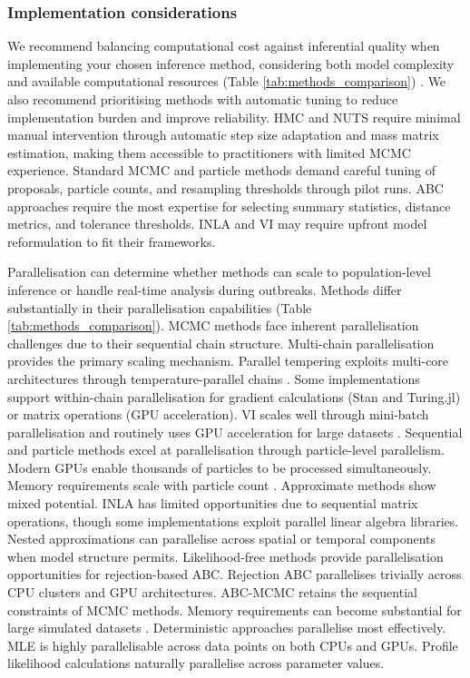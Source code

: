 \documentclass{article}
\begin{document}
\subsubsection{Implementation considerations}

We recommend balancing computational cost against inferential quality when implementing your chosen inference method, considering both model complexity and available computational resources (Table \ref{tab:methods_comparison}) \citep{funk2020choices}.
We also recommend prioritising methods with automatic tuning to reduce implementation burden and improve reliability.
HMC and NUTS require minimal manual intervention through automatic step size adaptation and mass matrix estimation, making them accessible to practitioners with limited MCMC experience.
Standard MCMC and particle methods demand careful tuning of proposals, particle counts, and resampling thresholds through pilot runs.
ABC approaches require the most expertise for selecting summary statistics, distance metrics, and tolerance thresholds.
INLA and VI may require upfront model reformulation to fit their frameworks.

Parallelisation can determine whether methods can scale to population-level inference or handle real-time analysis during outbreaks.
Methods differ substantially in their parallelisation capabilities (Table \ref{tab:methods_comparison}).
MCMC methods face inherent parallelisation challenges due to their sequential chain structure.
Multi-chain parallelisation provides the primary scaling mechanism.
Parallel tempering exploits multi-core architectures through temperature-parallel chains \citep{surjanovic2023pigeons}.
Some implementations support within-chain parallelisation for gradient calculations (Stan and Turing.jl) or matrix operations (GPU acceleration).
VI scales well through mini-batch parallelisation and routinely uses GPU acceleration for large datasets \citep{hoffman2013stochastic, Abbott2021-delta}.
Sequential and particle methods excel at parallelisation through particle-level parallelism.
Modern GPUs enable thousands of particles to be processed simultaneously.
Memory requirements scale with particle count \citep{henriksen2012parallel}.
Approximate methods show mixed potential.
INLA has limited opportunities due to sequential matrix operations, though some implementations exploit parallel linear algebra libraries.
Nested approximations can parallelise across spatial or temporal components when model structure permits.
Likelihood-free methods provide parallelisation opportunities for rejection-based ABC.
Rejection ABC parallelises trivially across CPU clusters and GPU architectures.
ABC-MCMC retains the sequential constraints of MCMC methods.
Memory requirements can become substantial for large simulated datasets \citep{kulkarni2022hardware}.
Deterministic approaches parallelise most effectively.
MLE is highly parallelisable across data points on both CPUs and GPUs.
Profile likelihood calculations naturally parallelise across parameter values.
\end{document}
